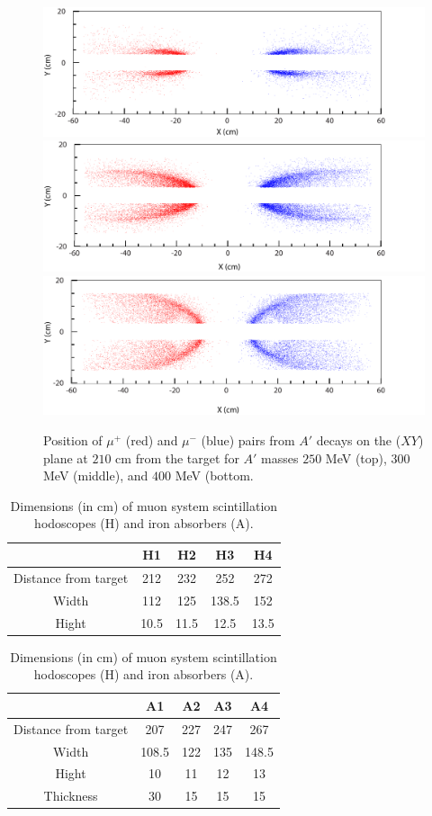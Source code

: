 \begin{figure}[!ht]
\includegraphics[scale=0.6]{muon/xy_m250.pdf}
\includegraphics[scale=0.6]{muon/xy_m300.pdf}
\includegraphics[scale=0.6]{muon/xy_m400.pdf}
\caption{\small{Position of $\mu^+$ (red) and $\mu^-$ (blue) pairs from $A'$ decays on the ($XY$) plane at $210$ cm from the target for $A'$ masses $250$ MeV (top), $300$ MeV (middle), and $400$ MeV (bottom.}}\label{fig:xymu}
\end{figure}

\begin{table}[htdp]
\caption{Dimensions (in cm) of muon system scintillation hodoscopes (H) and iron absorbers (A). }
\begin{center}
\begin{tabular}{|c|c|c|c|c|}
\hline
&H1&H2&H3&H4\\
\hline
Distance from target& 212&232&252&272\\
Width&112&125&138.5&152\\
Hight&10.5&11.5&12.5&13.5\\
\hline
\end{tabular}

\begin{tabular}{|c|c|c|c|c|}
\hline
&A1&A2&A3&A4\\
\hline
Distance from target& 207&227&247&267\\
Width&108.5&122&135&148.5\\
Hight&10&11&12&13\\
Thickness & 30 & 15& 15 & 15\\
\hline
\end{tabular}
\end{center}
\label{tb:muon}
\end{table}%


